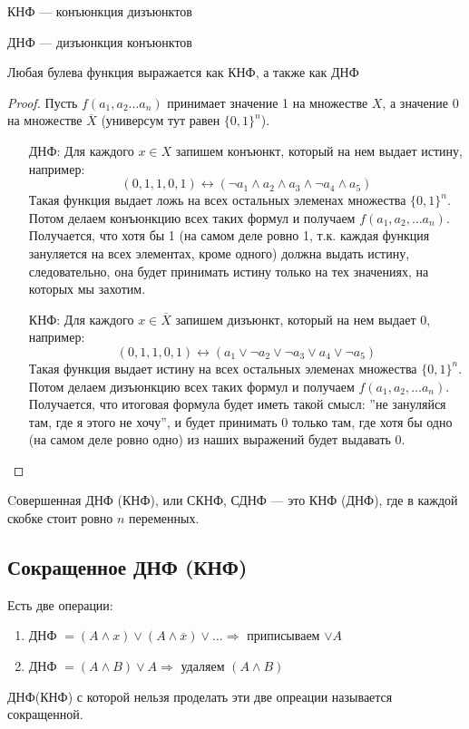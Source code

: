 \begin{definition}
    КНФ --- конъюнкция дизъюнктов
\end{definition}

\begin{definition}
    ДНФ --- дизъюнкция конъюнктов
\end{definition}

\begin{theorem}
    Любая булева функция выражается как КНФ, а также как ДНФ
\end{theorem}
\begin{proof}
    Пусть $f(a_1, a_2 \dots a_n)$ принимает значение 1 на множестве $X$, а значение 0 на множестве $\overline{X}$ (универсум тут равен $\{0, 1\}^n$).
    \begin{enumerate}
        \item[ДНФ:] Для каждого $x \in X$ запишем конъюнкт, который на нем выдает истину, например:
        $$(0, 1, 1, 0, 1) \leftrightarrow (\neg a_1 \wedge a_2 \wedge a_3 \wedge \neg a_4 \wedge a_5)$$
        Такая функция выдает ложь на всех остальных элеменах множества $\{0, 1\}^n$. Потом делаем конъюнкцию всех таких формул и получаем $f(a_1, a_2, \dots a_n)$. Получается, что хотя бы 1 (на самом деле ровно 1, т.к. каждая функция зануляется на всех элементах, кроме одного) должна выдать истину, следовательно, она будет принимать истину только на тех значениях, на которых мы захотим.
        \item[КНФ:] Для каждого $x \in \overline{X}$ запишем дизъюнкт, который на нем выдает 0, например:
        $$(0, 1, 1, 0, 1) \leftrightarrow (a_1 \vee\neg a_2 \vee\neg a_3 \vee a_4 \vee \neg a_5)$$
        Такая функция выдает истину на всех остальных элеменах множества $\{0, 1\}^n$. Потом делаем дизъюнкцию всех таких формул и получаем $f(a_1, a_2, \dots a_n)$. Получается, что итоговая формула будет иметь такой смысл: ''не зануляйся там, где я этого не хочу'', и будет принимать 0 только там, где хотя бы одно (на самом деле ровно одно) из наших выражений будет выдавать 0.
    \end{enumerate}
\end{proof}

\begin{definition}
    Cовершенная ДНФ (КНФ), или СКНФ, СДНФ --- это КНФ (ДНФ), где в каждой скобке стоит ровно $n$ переменных.
\end{definition}

\subsection{Сокращенное ДНФ (КНФ)}
Есть две операции:
\begin{enumerate}
    \item ДНФ $= (A \wedge x) \vee (A \wedge \overline{x}) \vee \dots \Rightarrow$ приписываем $\vee A$
    \item ДНФ $= (A \wedge B) \vee A \Rightarrow$ удаляем $(A\wedge B)$
\end{enumerate}
\begin{definition}
    ДНФ(КНФ) с которой нельзя проделать эти две опреации называется сокращенной.
\end{definition}

